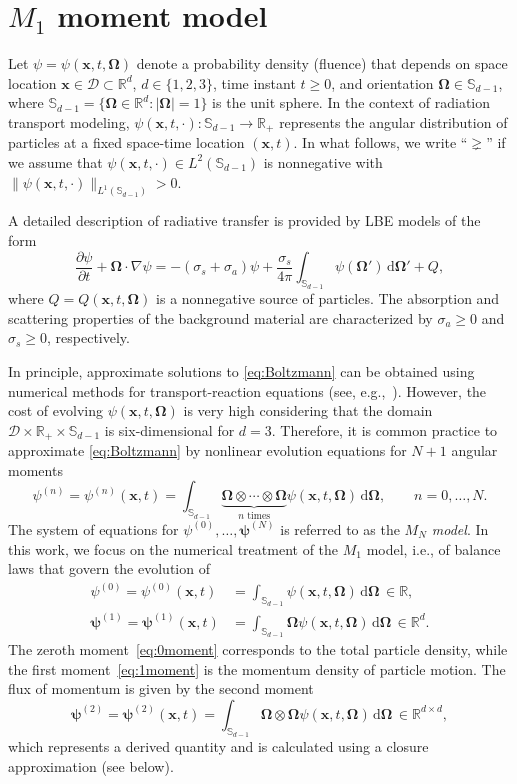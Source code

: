 \documentclass[preprint, 11pt]{elsarticle}
\newcommand{\diff}{\mathrm{d} }
\newcommand{\R}{\mathbb{R}}
\newcommand{\x}{\mathbf{x}}
\newcommand{\D}{\mathcal{D}}
\newcommand{\Sp}{\mathbb{S}_{d-1}}
\newcommand{\OO}{\bm{\Omega}}
\newcommand{\pz}{\psi^{(0)}}
\newcommand{\po}{\boldsymbol{\psi}^{(1)}}
\newcommand{\pt}{\boldsymbol{\psi}^{(2)}}
\begin{document}
\section{$M_1$ moment model} \label{sec:M1}

Let $\psi=\psi(\x,t,\OO)$ denote a probability density (fluence) that
depends on space location $\x\in\D\subset\R^d$, $d\in\{ 1,2,3\}$, time
instant $t\geq 0$, and orientation $\OO\in\Sp$, where
$\Sp = \{\OO\in\R^d: |\OO|= 1\}$ is the unit sphere.
In the context of radiation transport modeling,
$\psi(\x,t,\cdot):\Sp\to\R_+$ represents
 the angular distribution of particles at a fixed space-time
 location $(\x,t)$. In what follows, we write ``$\gneq$'' if we
 assume that $\psi(\x,t,\cdot)\in L^2(\Sp)$ is nonnegative
 with $\|\psi(\x,t,\cdot)\|_{L^1(\Sp)}>0$.

A detailed description of radiative transfer is provided by
LBE models of the form ~\cite{alldredge2012,monreal2013}
\begin{equation}\label{eq:Boltzmann}
    \frac{\partial \psi}{\partial t} + \OO \cdot \nabla\psi = - (\sigma_s + \sigma_a)\psi + \frac{\sigma_s}{4\pi}\int_{\Sp}\psi(\OO')\,\diff\OO'+Q,
\end{equation}
where $Q=Q(\x,t,\OO)$ is a nonnegative source of particles. The absorption and scattering properties of the background material are characterized by 
$\sigma_a\geq 0$ and $\sigma_s\geq0$, respectively.

In principle, approximate solutions to \eqref{eq:Boltzmann} can be
obtained using numerical methods for transport-reaction equations
(see, e.g.,~\cite{godoy2010,hansel2018,yuan2016}). However, the cost of evolving
$\psi(\x,t,\OO)$ is very high considering that the domain
$\D\times \R_+\times\Sp$ is six-dimensional for $d=3$. Therefore,
it is common practice to approximate \eqref{eq:Boltzmann} by nonlinear
evolution equations for $N+1$ angular moments
$$
\psi^{(n)} = \psi^{(n)}(\x,t) = \int_{\Sp}\underbrace{\OO \otimes \cdots \otimes \OO}_{n\text{ times}}
\psi(\x,t,\OO)\,\diff\OO,\qquad n=0,\ldots,N.
$$
The system of equations for $\psi^{(0)},\ldots,\boldsymbol{\psi}^{(N)}$
is referred to as the \emph{$M_N$ model}. In this work, we
focus on the
numerical treatment of the $M_1$ model, i.e., of balance laws that
govern the evolution of
\begin{align}
    \pz = \pz(\x,t) &= \int_{\Sp} \psi(\x,t,\OO)\,\diff\OO\,\in\R,\label{eq:0moment}\\
    \po = \po(\x,t) &= \int_{\Sp} \OO \psi(\x,t,\OO)\,\diff\OO\,\in\R^d.\label{eq:1moment}
\end{align}
The zeroth moment~\eqref{eq:0moment} corresponds to the total particle density, while the first moment~\eqref{eq:1moment} is the momentum density of particle motion. The flux of momentum is given by the second moment
\begin{equation*}
  \pt=\pt(\x,t) = \int_{\Sp} \OO\otimes\OO \psi(\x,t,\OO)\,\diff\OO\,\in\R^{d\times d},
\end{equation*}
which represents a derived quantity and is calculated using a closure
approximation (see below).
\end{document}
